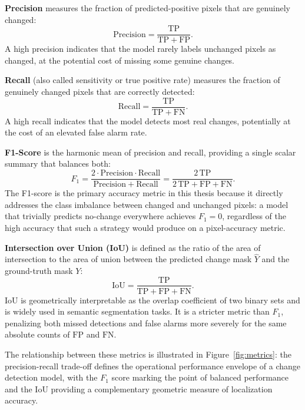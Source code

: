 \noindent\textbf{Precision} measures the fraction of predicted-positive pixels
that are genuinely changed:
\begin{equation}
\mathrm{Precision}
    = \frac{\mathrm{TP}}{\mathrm{TP} + \mathrm{FP}}.
\label{eq:precision}
\end{equation}
A high precision indicates that the model rarely labels unchanged pixels as
changed, at the potential cost of missing some genuine changes.

\noindent\textbf{Recall} (also called sensitivity or true positive rate)
measures the fraction of genuinely changed pixels that are correctly detected:
\begin{equation}
\mathrm{Recall}
    = \frac{\mathrm{TP}}{\mathrm{TP} + \mathrm{FN}}.
\label{eq:recall}
\end{equation}
A high recall indicates that the model detects most real changes, potentially
at the cost of an elevated false alarm rate.

\noindent\textbf{F1-Score} is the harmonic mean of precision and recall,
providing a single scalar summary that balances both:
\begin{equation}
F_1
    = \frac{2 \cdot \mathrm{Precision} \cdot \mathrm{Recall}}
           {\mathrm{Precision} + \mathrm{Recall}}
    = \frac{2\,\mathrm{TP}}{2\,\mathrm{TP} + \mathrm{FP} + \mathrm{FN}}.
\label{eq:f1}
\end{equation}
The F1-score is the primary accuracy metric in this thesis because it directly
addresses the class imbalance between changed and unchanged pixels: a model
that trivially predicts no-change everywhere achieves $F_1 = 0$, regardless
of the high accuracy that such a strategy would produce on a pixel-accuracy
metric.

\noindent\textbf{Intersection over Union (IoU)} is defined as the ratio of
the area of intersection to the area of union between the predicted change
mask $\hat{Y}$ and the ground-truth mask $Y$:
\begin{equation}
\mathrm{IoU}
    = \frac{\mathrm{TP}}{\mathrm{TP} + \mathrm{FP} + \mathrm{FN}}.
\label{eq:iou}
\end{equation}
IoU is geometrically interpretable as the overlap coefficient of two binary
sets and is widely used in semantic segmentation tasks. It is a stricter metric
than $F_1$, penalizing both missed detections and false alarms more severely
for the same absolute counts of $\mathrm{FP}$ and $\mathrm{FN}$.

The relationship between these metrics is illustrated in
Figure~\ref{fig:metrics}: the precision-recall trade-off defines the
operational performance envelope of a change detection model, with the $F_1$
score marking the point of balanced performance and the IoU providing a
complementary geometric measure of localization accuracy.

